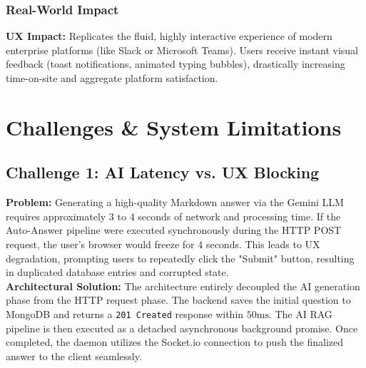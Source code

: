 \documentclass[12pt,a4paper]{article}
\begin{document}
\vspace{0.5cm}
\begin{center}
\end{center}

\subsubsection{Real-World Impact}
\textbf{UX Impact:} Replicates the fluid, highly interactive experience of modern enterprise platforms (like Slack or Microsoft Teams). Users receive instant visual feedback (toast notifications, animated typing bubbles), drastically increasing time-on-site and aggregate platform satisfaction.

\newpage

\section{Challenges \& System Limitations}
\vspace{0.5cm}

\subsection{Challenge 1: AI Latency vs. UX Blocking}
\textbf{Problem:} Generating a high-quality Markdown answer via the Gemini LLM requires approximately 3 to 4 seconds of network and processing time. If the Auto-Answer pipeline were executed synchronously during the HTTP POST request, the user's browser would freeze for 4 seconds. This leads to UX degradation, prompting users to repeatedly click the "Submit" button, resulting in duplicated database entries and corrupted state. \\
\textbf{Architectural Solution:} The architecture entirely decoupled the AI generation phase from the HTTP request phase. The backend saves the initial question to MongoDB and returns a \texttt{201 Created} response within $50\text{ms}$. The AI RAG pipeline is then executed as a detached asynchronous background promise. Once completed, the daemon utilizes the Socket.io connection to push the finalized answer to the client seamlessly.
\end{document}
